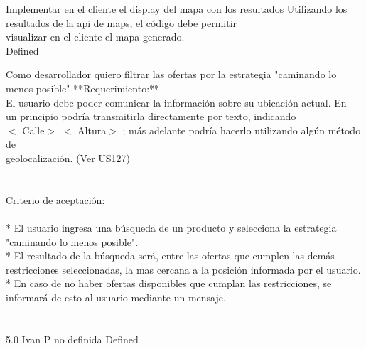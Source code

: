		{Implementar en el cliente el display del mapa con los resultados} %
		{Utilizando los resultados de la api de maps, el código debe permitir\\
visualizar en el cliente el mapa generado.\\
} %
		{} %
		{} %
		{} %
		{Defined} %


\vspace{20pt}

	{Como desarrollador quiero filtrar las ofertas por la estrategia "caminando lo menos posible"} %
	{**Requerimiento:**\\
El usuario debe poder comunicar la información sobre su ubicación actual. En\\
un principio podría transmitirla directamente por texto, indicando\\
$<$ Calle$>$ $<$ Altura$>$ ; más adelante podría hacerlo utilizando algún método de\\
geolocalización. (Ver US127)\\
  \\
  \\
Criterio de aceptación:\\
  \\
* El usuario ingresa una búsqueda de un producto y selecciona la estrategia "caminando lo menos posible".  \\
* El resultado de la búsqueda será, entre las ofertas que cumplen las demás restricciones seleccionadas, la mas cercana a la posición informada por el usuario.\\
* En caso de no haber ofertas disponibles que cumplan las restricciones, se informará de esto al usuario mediante un mensaje. \\
  \\
  \\
} %
	{} %
	{5.0} %
	{Ivan P} %
	{no definida} %
	{Defined} %


\vspace{20pt}

